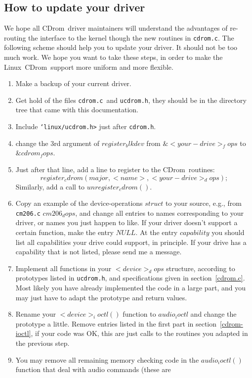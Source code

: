 \documentclass{article}
\def\linux{{\sc Linux}}
\def\cdrom{{\sc CDrom}}
\def\cdromc{{\tt cdrom.c}}
\def\ucdrom{{\tt ucdrom.h}}
\begin{document}
\subsection{How to update your driver}

We hope all \cdrom\ driver maintainers will understand the advantages
of re-routing the interface to the kernel though the new routines in
\cdromc. The following scheme should help you to update your
driver. It should not be too much work. We hope you want to take these
steps, in order to make the \linux\ \cdrom\ support more uniform and
more flexible.
\begin{enumerate}
\item Make a backup of your current driver. 
\item Get hold of the files \cdromc\ and \ucdrom, they should be in
the directory tree that came with this documentation. 
\item Include {\tt \char`\<linux/ucdrom.h>} just after {\tt cdrom.h}.
\item change the 3rd argument of $register_blkdev$ from
$\&<your-drive>_fops$ to $\&cdrom_fops$. 
\item Just after that line, add a line to register to the \cdrom\
routines: 
$$register_cdrom(major, <name>, <your-drive>_dops);$$
Similarly, add a call to $unregister_cdrom()$. 
\item Copy an example of the device-operations $struct$ to your source,
e.g., from {\tt cm206.c} $cm206_dops$, and change all entries to names
corresponding to your driver, or names you just happen to like. If
your driver doesn't support a certain function, make the entry
$NULL$. At the entry $capability$ you should list all capabilities
your drive could support, in principle. If your drive has a capability
that is not listed, please send me a message.
\item Implement all functions in your $<device>_dops$ structure,
according to prototypes listed in \ucdrom, and specifications given in
section~\ref{cdrom.c}. Most likely you have already implemented
the code in a large part, and you may just have to adapt the prototype
and return values. 
\item Rename your $<device>_ioctl()$ function to $audio_ioctl$ and
change the prototype a little. Remove entries listed in the first part
in section~\ref{cdrom-ioctl}, if your code was OK, this are just calls
to the routines you adapted in the previous step. 
\item You may remove all remaining memory checking code in the
$audio_ioctl()$ function that deal with audio commands (these are

\end{enumerate}
\end{document}
